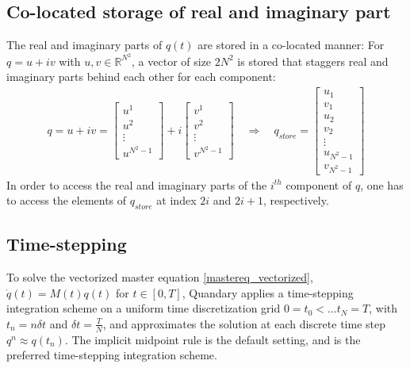 \documentclass[letterpaper]{article}
\newcommand{\R}{\mathds{R}}
\begin{document}
  \subsection{Co-located storage of real and imaginary part}
  The real and imaginary parts of $q(t)$ are stored in a co-located manner: For
  $q = u+iv$ with $u,v\in\R^{N^2}$, a vector of size $2N^2$ is stored that
  staggers real and imaginary parts behind each other for each component:
  \begin{align*}
    q = u+iv = \begin{bmatrix}
     u^1\\u^2\\ \vdots \\ u^{N^2-1} 
    \end{bmatrix}
    + i \begin{bmatrix}
     v^1\\v^2\\ \vdots \\ v^{N^2-1} 
    \end{bmatrix}
    \quad \Rightarrow \quad
    q_{store} = \begin{bmatrix}
      u_1 \\ v_1\\ u_2 \\ v_2 \\ \vdots \\ u_{N^2-1} \\ v_{N^2-1}
    \end{bmatrix}
  \end{align*}
  In order to access the real and imaginary parts of the $i^{th}$ component of
  $q$, one has to access the elements of $q_{store}$ at index $2i$ and $2i+1$,
  respectively. 

  \subsection{Time-stepping}
    To solve the vectorized master equation \eqref{mastereq_vectorized}, $\dot
    q(t) = M(t) q(t)$ for $t\in [0,T]$, Quandary applies a time-stepping integration
    scheme on a uniform time discretization grid $0=t_0 < \dots t_{N} = T$, with
    $t_n = n \delta t$ and $\delta t = \frac{T}{N}$, and approximates the
    solution at each discrete time step $q^{n} \approx q(t_n)$. The implicit midpoint rule is the default setting, and is the preferred time-stepping integration scheme. 
   
\end{document}
